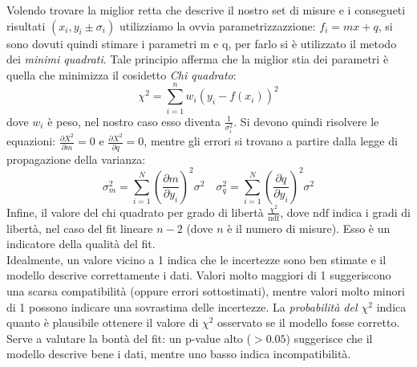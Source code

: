 \documentclass[10pt,twocolumn]{article}
\begin{document}
Volendo trovare la miglior retta che descrive il nostro set di misure e i consegueti risultati $(x_i,y_i \pm \sigma_i)$
utilizziamo la ovvia parametrizzazzione: $f_i=mx+q$, si sono dovuti quindi stimare i parametri m e q, per farlo si è utilizzato il metodo dei \textit{minimi quadrati}.
Tale principio afferma che la miglior stia dei parametri è quella che minimizza il cosidetto \textit{Chi quadrato}:
\[
\chi^2=\sum_{i=1}^{n}w_i(y_i-f(x_i))^2
\]
dove $w_i$ è peso, nel nostro caso esso diventa $\frac{1}{\sigma_i^2}$. Si devono quindi risolvere le equazioni:
$\frac{\partial X^2}{\partial m}=0$ e $\frac{\partial X^2}{\partial q}=0$, mentre gli errori si trovano a partire dalla legge di propagazione della varianza:
\begin{equation*}
\sigma_{{m}}^2 = \sum_{i=1}^N \left( \frac{\partial m}{\partial y_i} \right)^2 \sigma^2
\quad
\sigma_{q}^2 = \sum_{i=1}^N \left( \frac{\partial q}{\partial y_i} \right)^2 \sigma^2
\end{equation*}
Infine, il valore del chi quadrato per grado di libertà $\frac{\chi^2}{\text{ndf}}$, dove $\text{ndf}$ indica i gradi di libertà, nel caso del fit lineare $n - 2$ (dove $n$ è il numero di misure). Esso è un indicatore della qualità del fit.\\
Idealmente, un valore vicino a 1 indica che le incertezze sono ben stimate e il modello descrive correttamente i dati. Valori molto maggiori di 1 suggeriscono una scarsa compatibilità (oppure errori sottostimati), mentre valori molto minori di 1 possono indicare una sovrastima delle incertezze.
La \textit{probabilità del $\chi^2$}  indica quanto è plausibile ottenere il valore di $\chi^2$ osservato se il modello fosse corretto. Serve a valutare la bontà del fit: un p-value alto ($>0.05$) suggerisce che il modello descrive bene i dati, mentre uno basso indica incompatibilità.
\end{document}
